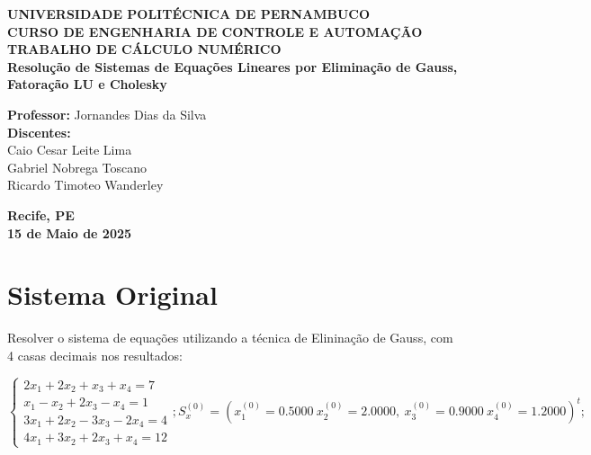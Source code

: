 \documentclass[12pt]{article}
\begin{document}
    \begin{titlepage}
        \begin{center}
            \vspace*{2cm}

            \textbf{\Large UNIVERSIDADE POLITÉCNICA DE PERNAMBUCO}\\[0.6cm]
            \textbf{\large CURSO DE ENGENHARIA DE CONTROLE E AUTOMAÇÃO}\\[2cm]

            \textbf{\Huge TRABALHO DE CÁLCULO NUMÉRICO}\\[2cm]

            \textbf{\large Resolução de Sistemas de Equações Lineares por Eliminação de Gauss, Fatoração LU e Cholesky}\\[2cm]

            \begin{flushleft}
            \textbf{Professor:} Jornandes Dias da Silva\\[0.2cm]
            \textbf{Discentes:}\\
            Caio Cesar Leite Lima\\
            Gabriel Nobrega Toscano\\
            Ricardo Timoteo Wanderley
            \end{flushleft}

            \vfill

            \textbf{Recife, PE}\\
            \textbf{15 de Maio de 2025}

        \end{center}
    \end{titlepage}

    \tableofcontents
    \newpage


    \section{Sistema Original}
        Resolver o sistema de equações utilizando a técnica de Elininação de Gauss, com 4 casas decimais nos resultados:

        \[
        \begin{cases}
            2x_1 + 2x_2 + x_3 + x_4 = 7 \\
            x_1 - x_2 + 2x_3 - x_4 = 1 \\
            3x_1 + 2x_2 - 3x_3 - 2x_4 = 4\\
            4x_1 + 3x_2 + 2x_3 + x_4 = 12
        \end{cases};
        S_x^{(0)} = (x_1^{(0)} = 0.5000\ x_2^{(0)}= 2.0000,\ x_3^{(0)}= 0.9000\ x_4^{(0)}= 1.2000)^t;
        \]
\end{document}
